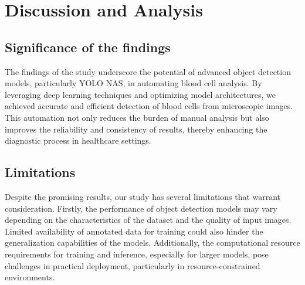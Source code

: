 \chapter{Discussion and Analysis}
 



\section{Significance of the findings}
The findings of the study underscore the potential of advanced object detection models, particularly YOLO NAS, in automating blood cell analysis. By leveraging deep learning techniques and optimizing model architectures, we achieved accurate and efficient detection of blood cells from microscopic images. This automation not only reduces the burden of manual analysis but also improves the reliability and consistency of results, thereby enhancing the diagnostic process in healthcare settings.

\section{Limitations} %
Despite the promising results, our study has several limitations that warrant consideration. Firstly, the performance of object detection models may vary depending on the characteristics of the dataset and the quality of input images. Limited availability of annotated data for training could also hinder the generalization capabilities of the models. Additionally, the computational resource requirements for training and inference, especially for larger models, pose challenges in practical deployment, particularly in resource-constrained environments.
